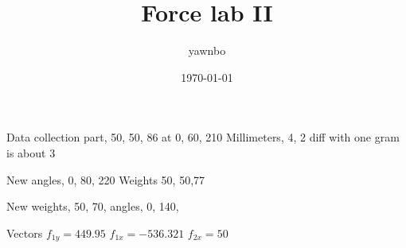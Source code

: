 \documentclass[a4paper]{article}
\title{Force lab II}
\author{yawnbo}
\date{\today}
\begin{document}
\maketitle
Data collection part, 50, 50, 86 at 0, 60, 210
Millimeters, 4, 2 diff with one gram is about 3

New angles, 0, 80, 220 Weights 50, 50,77

New weights, 50, 70, angles, 0, 140, 

Vectors
$ f_{ 1y } = 449.95$ $ f_{ 1x } = -536.321 $ $ f_{ 2x }= 50 $
\end{document}
